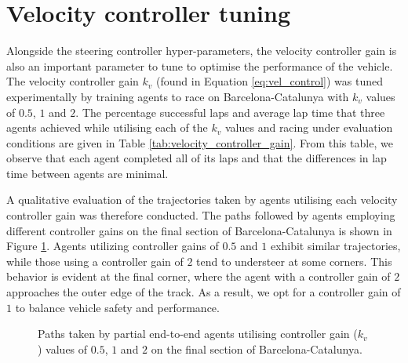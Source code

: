 \section{Velocity controller tuning}

Alongside the steering controller hyper-parameters, the velocity controller gain is also an important parameter to tune to optimise the performance of the vehicle.
The velocity controller gain $k_v$ (found in Equation \ref{eq:vel_control}) was tuned experimentally by training agents to race on Barcelona-Catalunya with $k_v$ values of $0.5$, $1$ and $2$.
The percentage successful laps and average lap time that three agents achieved while utilising each of the $k_v$ values and racing under evaluation conditions are given in Table \ref{tab:velocity_controller_gain}.
From this table, we observe that each agent completed all of its laps and that the differences in lap time between agents are minimal.




A qualitative evaluation of the trajectories taken by agents utilising each velocity controller gain was therefore conducted.
The paths followed by agents employing different controller gains on the final section of Barcelona-Catalunya is shown in Figure \ref{fig:kv_paths}.
Agents utilizing controller gains of $0.5$ and $1$ exhibit similar trajectories, while those using a controller gain of $2$ tend to understeer at some corners. 
This behavior is evident at the final corner, where the agent with a controller gain of $2$ approaches the outer edge of the track. 
As a result, we opt for a controller gain of $1$ to balance vehicle safety and performance.

\begin{figure}[t]
    \centering
    
    \caption[Paths taken by partial end-to-end agents utilising controller gain ($k_v$) values of $0.5$, $1$ and $2$ on the final section of  Barcelona-Catalunya]{Paths taken by partial end-to-end agents utilising controller gain ($k_v$) values of $0.5$, $1$ and $2$ on the final section of  Barcelona-Catalunya.}
    \label{fig:kv_paths}
\end{figure}







